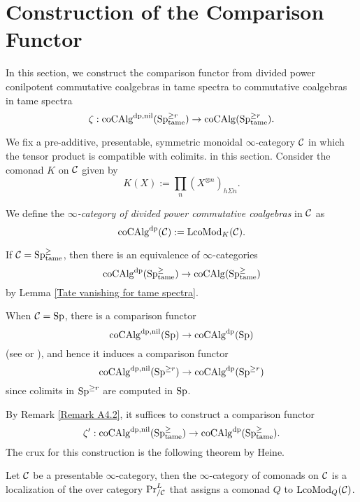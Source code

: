 \section{Construction of the Comparison Functor}
\label{Construction of the Comparison Functor}
In this section, we construct the comparison functor from divided power conilpotent commutative coalgebras in tame spectra to commutative coalgebras in tame spectra
$$
\zeta:\operatorname{coCAlg}^{\operatorname{dp},\operatorname{nil}}(\operatorname{Sp}^{\geq r}_{\operatorname{\operatorname{tame}}}) \to
\operatorname{coCAlg}(\operatorname{Sp}^{\geq r}_{\operatorname{\operatorname{tame}}}).
$$

We fix a pre-additive, presentable, symmetric monoidal $\infty$-category ${\mathcal{C}}$ in which the tensor product is compatible with colimits. in this section.
Consider the comonad $K$ on ${\mathcal{C}}$ given by 
$$
K(X) := \prod_n (X^{\otimes n})_{h\Sigma n}.
$$
\begin{definition}
    We define the \emph{$\infty$-category of divided power commutative coalgebras} in ${\mathcal{C}}$ as 
$$
\operatorname{coCAlg}^{\operatorname{dp}}({\mathcal{C}}):= \operatorname{LcoMod}_{K}({\mathcal{C}}).
$$
\end{definition}
\begin{remark}
\label{Remark A4.2}
If ${\mathcal{C}}=\operatorname{Sp}^{\geq}_{\operatorname{\operatorname{tame}}}$, then there is an equivalence of $\infty$-categories 
$$
\operatorname{coCAlg}^{\operatorname{dp}}(\operatorname{Sp}^{\geq}_{\operatorname{\operatorname{tame}}})
\to 
\operatorname{coCAlg}(\operatorname{Sp}^{\geq}_{\operatorname{\operatorname{tame}}})
$$
by Lemma \ref{Tate vanishing for tame spectra}.
\end{remark}

\begin{remark}
\label{Remark A4.3}
When ${\mathcal{C}}=\operatorname{Sp}$, there is a comparison functor
$$
\operatorname{coCAlg}^{\operatorname{dp}, \operatorname{nil}}(\operatorname{Sp}) \to  \operatorname{coCAlg}^{\operatorname{dp}}(\operatorname{Sp})
$$
(see \cite[Section 3.5]{Francis-Gaitsgory} or \cite{Heuts_Koszul}), and hence it induces a comparison functor
$$
\operatorname{coCAlg}^{\operatorname{dp}, \operatorname{nil}}(\operatorname{Sp}^{\geq r}) \to  \operatorname{coCAlg}^{\operatorname{dp}}(\operatorname{Sp}^{\geq r})
$$
since colimits in $\operatorname{Sp}^{\geq r}$ are computed in $\operatorname{Sp}$.
\end{remark}

By Remark \ref{Remark A4.2}, it suffices to construct a comparison functor
$$
\zeta':\operatorname{coCAlg}^{\operatorname{dp}, \operatorname{nil}}(\operatorname{Sp}^{\geq}_{\operatorname{\operatorname{tame}}})
\to 
\operatorname{coCAlg}^{\operatorname{dp}}(\operatorname{Sp}^{\geq}_{\operatorname{\operatorname{tame}}}).
$$
The crux for this construction is the following theorem by Heine.
\begin{theorem}
\label{Monads-Alg correspondence}
\cite[Theorem 5.1]{Heine_Monads}
Let ${\mathcal{C}}$ be a presentable $\infty$-category, then the $\infty$-category of comonads on ${\mathcal{C}}$ is a localization of the over category $\Pr^{L}_{/{\mathcal{C}}}$ that assigns a comonad $Q$ to $\operatorname{LcoMod}_{Q}({\mathcal{C}})$.
\end{theorem}

